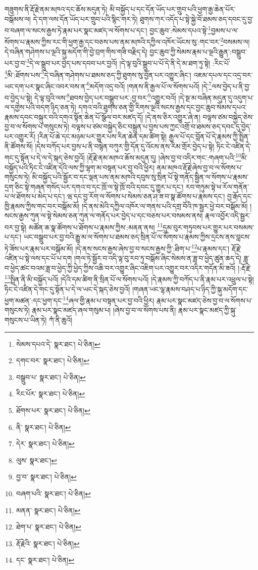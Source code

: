 གཟུགས་ནི་རྡོ་རྗེ་ནམ་མཁའ་དང་ཆོས་མདུན་ཏེ། མི་བསྐྱོད་པ་དང་དོན་ཡོད་པར་གྲུབ་པའི་ཕྱག་རྒྱ་ཆེན་པོར་བསྒོམས་ལ། དེ་དག་ལས་དོན་ཡོད་པར་གྲུབ་པའི་སྙིང་གར་ཏེ། ཐུགས་ཀར་འདོད་པ་སྟེ་སྐྱེ་བོ་ཐམས་ཅད་དབང་དུ་བྱ་བ་བཞག་ལ་སངས་རྒྱས་ཏེ་རྣམ་པར་སྣང་མཛད་ལ་སོགས་པ་དང་། བྱང་ཆུབ་:སེམས་དཔའ་སྟེ་\footnote{སེམས་དཔའ་དེ་  སྣར་ཐང་།  པེ་ཅིན། }བྱམས་པ་ལ་སོགས་པ་རྣམས་ཀྱིས་རང་གི་ཕྱག་རྒྱ་དང་བཅས་པས་ནམ་མཁའི་དཀྱིལ་འཁོར་ཡོངས་སུ་:གང་བར་\footnote{དགང་བར་  སྣར་ཐང་།  པེ་ཅིན། }བསམས་ལ། དེ་བཞིན་གཤེགས་པ་ལྔའི་སྐུ་མདོག་གི་བྱེ་བྲག་གིས་གཟི་བརྗིད་དེ། བྱང་ཆུབ་ཀྱི་སེམས་རྣམ་པ་ལྔའི་རྒྱུན་:བསྒྲུབ་པར་བྱ་བ་\footnote{བསྒྲུབ་པ་  སྣར་ཐང་།  པེ་ཅིན། }དེ་ལ་སྒྲུབ་པར་བྱེད་པས་དབབ་པར་བྱའོ། །དེ་ལྟ་བུའི་སྒྲུབ་པ་པོ་དེ་ནི་དེ་མ་ཐག་ཏུ་སྟེ། :རིང་པོ་\footnote{རིང་པོར་  སྣར་ཐང་།  པེ་ཅིན། }མི་:ཐོགས་པས་\footnote{ཐོགས་པར་  སྣར་ཐང་།  པེ་ཅིན། }དེ་བཞིན་གཤེགས་པ་ཐམས་ཅད་ཀྱི་ཐུགས་སུ་བྱོན་པར་འགྱུར་ཞིང་། འཇམ་དཔལ་དང་འདྲ་བར་ཡང་དག་པར་སྣང་ཞིང་འབར་བས་ན་\footnote{ནི་  སྣར་ཐང་།  པེ་ཅིན། }མདོག་འདྲ་བའོ། །གནས་ནི་རྒྱལ་པོ་ལ་སོགས་པའོ། །དེ་\footnote{དེར་  སྣར་ཐང་།  པེ་ཅིན། }ལས་བྱེད་པ་ནི་བྱ་བ་བྱེད་པ་སྟེ། དེ་ལྟ་བུའི་ལས་\footnote{ལུས་  སྣར་ཐང་། }ཐབས་བྱེད་པར་བསྒྲུབ་པར་:བྱ་བར་\footnote{བྱ་བ་  སྣར་ཐང་།  པེ་ཅིན། }འགྱུར་བའོ། །དེ་སྔ་མ་བཞིན་མདུན་དུ་འདུག་པ་ལ་དགྱེས་པའི་བདག་ཉིད་ཅན་ཏེ། དགའ་བའི་ཐུགས་ཅན་གྱི་རིགས་ལྔའི་སངས་རྒྱས་དང་བྱང་ཆུབ་སེམས་དཔའ་རྣམས་དབང་བསྐུར་བའི་དགའ་སྟོན་ཆེན་པོ་སྩོལ་བར་མཛད་དོ། །དེ་ནས་ཅིར་འགྱུར་ཞེ་ན། བལྟས་ཙམ་བསྐྱེད་ཅེས་བྱ་བ་ལ་སོགས་པ་གསུངས་ཏེ། བལྟས་པ་ཙམ་བསྐྱེད་ཅིང་བསྐྲུན་པ་བྱས་པས་ཀྱང་འགྲོ་བ་ཐམས་ཅད་དབང་དུ་བྱེད་པར་འགྱུར་རོ། །རིན་པོ་ཆེ་དང་མཉམ་པར་གྱུར་པས་རིན་ཆེན་དམ་ཚིག་སྟེ། རྒྱལ་པོ་དང་བློན་པོ་དེ་རྣམས་ཀྱི་སྤྲིན་ནི་ཚོགས་སོ། །དེས་བཀོད་པར་བྱས་པ་ནི་བསྙེན་བཀུར་གྱི་དོན་དུ་འོངས་ནས་རིམ་གྲོར་བྱེད་པ་སྟེ། ཏིང་ངེ་འཛིན་དེ་གང་དུ་སྟོན་པ་དེ་ལ་དེ་སྐད་ཅེས་བྱའོ། །རྡོ་རྗེ་ནམ་མཁའ་ཆོས་མདུན་དུ། །ཞེས་བྱ་བ་འདིར་གང་:གཞག་པའི་\footnote{བཞག་པའི་  སྣར་ཐང་།  པེ་ཅིན། }མི་བསྐྱོད་པའི་ཏིང་ངེ་འཛིན་དེའི་ལས་ཀྱི་ལྷག་མ་བསྟན་པར་བྱ་བའི་ཕྱིར། ནམ་མཁའ་རྡོ་རྗེ་ཞེས་བྱ་བ་ལ་སོགས་པ་གསུངས་ཏེ། མི་བསྐྱོད་པའི་སྦྱོར་བ་དང་ལྡན་པས་ནམ་མཁའི་དབུས་སུ་སྲིན་པོ་སྟེ་གནོད་སྦྱིན་ལ་སོགས་པ་རྣམས་དྲག་ཅིང་སྟེ་གཞན་གསོད་པར་དགའ་བ་དང་ཁྲོ་ལ་སྟེ་ཁྲོ་བའི་དབང་དུ་གྱུར་པ་དང་། རབ་གཏུམ་སྟེ་ཕ་རོལ་གནོན་པ་ལ་ཐོགས་པ་མེད་པ་དང་། ཝ་དང་བྱ་རོག་ལ་སོགས་པ་སེམས་ཅན་ཤ་ཟ་བ་སྣ་ཚོགས་པ་རྣམས་དང་། བྱ་རྒོད་དང་ཁྱི་རྣམས་ཀྱིས་གང་བར་བསྒོམ་མོ། །དེ་ནས་མེའི་དཀྱིལ་འཁོར་ལ་གནས་པའི་དགྲ་བོའི་ཁ་སྦྱར་ཕྱེ་བར་བསྒོམ་མོ། །སངས་རྒྱས་ཀུན་ལ་སྟེ་སེམས་ཅན་ཀུན་ལ་གནོད་པར་བྱེད་པ་དང་བཅས་པར་བསམས་ནས། རྣལ་འབྱོར་འདི་སྦྱར་བར་བྱ་སྟེ། མཚོན་ཆ་སྣ་ཚོགས་པ་ཐོགས་པ་རྣམས་ཀྱིས་:མནན་ནས། \footnote{མནན་  སྣར་ཐང་།  པེ་ཅིན། }དུམ་བུར་གཏུབས་པར་གྱུར་པར་བསམས་པ་དང་། ཡང་བསྒྲུབ་པར་བྱ་བའི་རྒྱུ་མ་ལ་སོགས་པ་ཐམས་ཅད་སྲིན་པོ་ལ་སོགས་པ་རྣམས་ཀྱིས་དྲངས་ནས་བླངས་ཏེ་ཟོས་པར་རྣམ་པར་བསྒོམ་མོ། །དེ་ནས་སངས་རྒྱས་ཞེས་བྱ་བ་སངས་རྒྱས་ཀྱི་:ཐིག་པ་\footnote{ཐེག་པ་  སྣར་ཐང་།  པེ་ཅིན། }པ་རྣམས་དང་། རྡོ་རྗེ་འཛིན་པ་སྟེ་ལས་དང་པོ་པ་དག །གལ་ཏེ་སྦྱོར་བ་འདི་ལྟ་བུ་རབ་ཏུ་བསྒོམ་ཞིང་སེམས་ན་ཟླ་བ་ཕྱེད་ཚུན་ཆད་དེ། ཟླ་བ་ཕྱེད་ཚང་བའམ་ཟླ་བ་ཕྱེད་ཀྱི་ཕྱེད་ཀྱིས་འཆི་བར་འགྱུར་ཞིང་འཇིག་པར་འགྱུར་བར་འདིར་གདོན་མི་ཟའོ། །:རྡོ་རྗེ་\footnote{རྡོ་རྗེའི་  སྣར་ཐང་།  པེ་ཅིན། }སྤྲིན་ནི་མི་བསྐྱོད་པའོ། །དེའི་དམ་ཚིག་ནི་སྲིན་པོ་ལ་སོགས་པའོ། །དེ་རྣམས་ཀྱི་བཀོད་པ་ནི་རྣམ་པར་འཕྲུལ་པ་སྟེ། ཏིང་ངེ་འཛིན་དེ་གང་དུ་སྟོན་པ་དེ་ལ་ཡང་དེ་སྐད་ཅེས་བྱའོ། །གཞན་ཡང་ལྷ་རྣམས་བཤད་པ་ཉིད་ཀྱི་སྐུ་མདོག་དང་ཕྱག་མཚན་:དང་ཕྱག་དང་\footnote{དང་  སྣར་ཐང་།  པེ་ཅིན། }ཞལ་གྱི་རྣམ་པ་བསྟན་པར་བྱ་བའི་ཕྱིར། རྣམ་པར་སྣང་མཛད་ཅེས་བྱ་བ་ལ་སོགས་པ་གསུངས་ཏེ། རྣམ་པར་སྣང་མཛད་ཞལ་གསུམ་པ། །ཞེས་བྱ་བ་ལ་སོགས་པས་ནི། རྣམ་པར་སྣང་མཛད་ཀྱི་སྐུ་གསུངས་པ་ཡིན་ཏེ། ཀཾ་ནི་ཆུའོ། 